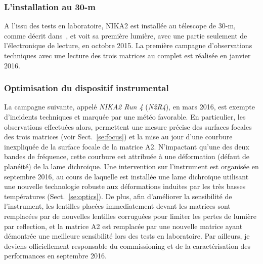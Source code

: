 \subsubsection{L'installation au 30-m}
A l'issu des tests en laboratoire, NIKA2 est installée au télescope de
30-m, comme décrit dans~\citet{Adam2018}, et voit sa première lumière,
avec une partie seulement de l'électronique de lecture, en octobre
2015. La première campagne d'observations techniques avec une lecture
des trois matrices au complet est réalisée en janvier 2016.

\subsubsection{Optimisation du dispositif instrumental}
La campagne suivante, appelé \emph{NIKA2 Run 4} (\emph{N2R4}), en mars
2016, est exempte d'incidents techniques et marquée par une météo
favorable. En particulier, les observations effectuées alors,
permettent une mesure précise des surfaces focales des trois matrices
(voir Sect.~\ref{se:focus}) et la mise au jour d'une courbure
inexpliquée de la surface focale de la matrice A2. N'impactant qu'une
des deux bandes de fréquence, cette courbure est attribuée à une
déformation (défaut de planéité) de la lame dichroïque. Une
intervention sur l'instrument est organisée en
septembre 2016, au cours de laquelle est installée une lame dichroïque
utilisant une nouvelle technologie robuste aux
déformations induites par les très basses températures
(Sect.~\ref{se:optics}). De plus, afin d'améliorer la sensibilité de
l'instrument, les lentilles placées immediatement devant les matrices
sont remplacées par de nouvelles lentilles corruguées pour limiter
les pertes de lumière par reflection, et la matrice A2 est remplacée
par une nouvelle matrice ayant démontrée une meilleure sensibilité
lors des tests en laboratoire. Par ailleurs, je deviens officiellement
responsable du commissioning et de la caractérisation des performances
en septembre 2016.

